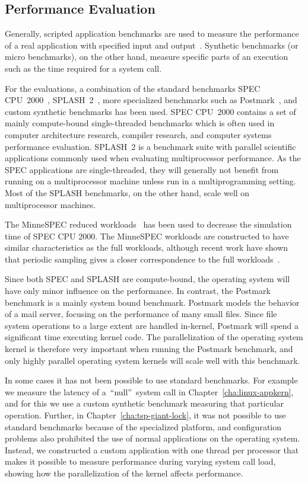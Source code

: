 \subsection{Performance Evaluation}
Generally, scripted application benchmarks are used to measure the performance
of a real application with specified input and output~\cite[page
27]{hennessy03computer}. Synthetic benchmarks (or micro benchmarks), on the
other hand, measure specific parts of an execution such as the time required
for a system call.

For the evaluations, a combination of the standard benchmarks SPEC
CPU~2000~\cite{spec2000}, SPLASH~2~\cite{cameron95splash}, more specialized
benchmarks such as Postmark~\cite{katcherpostmark}, and custom synthetic
benchmarks has been used. SPEC CPU~2000 contains a set of mainly compute-bound
single-threaded benchmarks which is often used in computer architecture
research, compiler research, and computer systems performance evaluation.
SPLASH~2 is a benchmark suite with parallel scientific applications commonly
used when evaluating multiprocessor performance. As the SPEC applications are
single-threaded, they will generally not benefit from running on a
multiprocessor machine unless run in a multiprogramming setting. Most of the
SPLASH benchmarks, on the other hand, scale well on multiprocessor machines.

The MinneSPEC reduced workloads~\cite{minnespec} has been used to decrease the
simulation time of SPEC CPU 2000. The MinneSPEC workloads are constructed to
have similar characteristics as the full workloads, although recent work have
shown that periodic sampling gives a closer correspondence to the full
workloads~\cite{yi05techniques}.

Since both SPEC and SPLASH are compute-bound, the operating system will have
only minor influence on the performance. In contrast, the
Postmark~\cite{katcherpostmark} benchmark is a mainly system bound benchmark.
Postmark models the behavior of a mail server, focusing on the performance of
many small files.  Since file system operations to a large extent are handled
in-kernel, Postmark will spend a significant time executing kernel code. The
parallelization of the operating system kernel is therefore very important
when running the Postmark benchmark, and only highly parallel operating system
kernels will scale well with this benchmark.

In some cases it has not been possible to use standard benchmarks. For example
we measure the latency of a~``null''~system call in
Chapter~\ref{cha:linux-appkern}, and for this we use a custom synthetic
benchmark measuring that particular operation. Further, in
Chapter~\ref{cha:tsp-giant-lock}, it was not possible to use standard
benchmarks because of the specialized platform, and configuration problems
also prohibited the use of normal applications on the operating system.
Instead, we constructed a custom application with one thread per processor
that makes it possible to measure performance during varying system call load,
showing how the parallelization of the kernel affects performance.

